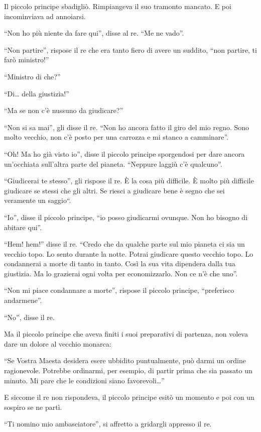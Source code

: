 \documentclass[11pt]{scrbook}
\begin{document}
Il piccolo principe sbadigliò. Rimpiangeva il suo tramonto mancato. E poi incominviava ad annoiarsi.

``Non ho più niente da fare qui'', disse al re. ``Me ne vado''.

``Non partire'', rispose il re che era tanto fiero di avere un suddito, ``non partire, ti farò ministro!''

``Ministro di che?''

``Di\ldots{} della giustizia!''

``Ma se non c'è nussuno da giudicare?''

``Non si sa mai'', gli disse il re. ``Non ho ancora fatto il giro del mio regno. Sono molto vecchio, non c'è posto per una carrozza e mi stanco a camminare''.

``Oh! Ma ho già visto io'', disse il piccolo principe sporgendosi per dare ancora un'occhiata sull'altra parte del pianeta. ``Neppure laggiù c'è qualcuno''.

``Giudicerai te stesso'', gli rispose il re. È la cosa più difficile. È molto più difficile giudicare se stessi che gli altri. Se riesci a giudicare bene è segno che sei veramente un saggio``.

``Io'', disse il piccolo principe, ``io posso giudicarmi ovunque. Non ho bisogno di abitare qui''.

``Hem! hem!'' disse il re. ``Credo che da qualche parte sul mio pianeta ci sia un vecchio topo. Lo sento durante la notte. Potrai giudicare questo vecchio topo. Lo condannerai a morte di tanto in tanto. Così la sua vita dipendera dalla tua giustizia. Ma lo grazierai ogni volta per economizzarlo. Non ce n'è che uno''.

``Non mi piace condannare a morte'', rispose il piccolo principe, ``preferisco andarmene''.

``No'', disse il re.

Ma il piccolo principe che aveva finiti i suoi preparativi di partenza, non voleva dare un dolore al vecchio monarca:

``Se Vostra Maesta desidera esere ubbidito puntualmente, può darmi un ordine ragionevole. Potrebbe ordinarmi, per esempio, di partir prima che sia passato un minuto. Mi pare che le condizioni siano favorevoli\ldots{}''

E siccome il re non rispondeva, il piccolo principe esitò un momento e poi con un sospiro se ne partì.

``Ti nomino mio ambasciatore'', si affretto a gridargli appresso il re.
\end{document}
